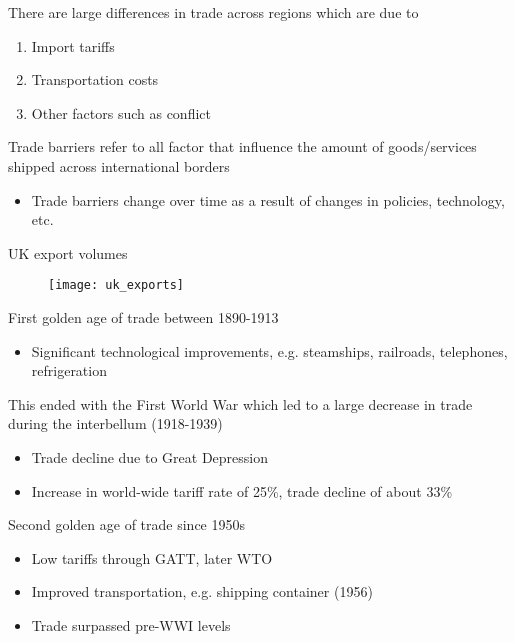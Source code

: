 \documentclass{beamer}
\begin{document}
\begin{frame}
  There are large differences in trade across regions which are due to
    \begin{enumerate}
      \item Import tariffs
      \item Transportation costs
      \item Other factors such as conflict
    \end{enumerate}
    \medskip
  Trade barriers refer to all factor that influence the amount of goods/services shipped across international borders
  \begin{itemize}
    \item Trade barriers change over time as a result of changes in policies, technology, etc. 
  \end{itemize}
\end{frame}

\begin{frame}{UK export volumes}
  \begin{figure}
    \texttt{[image: uk\_exports]}
  \end{figure}
  
\end{frame}



\begin{frame}{}
First golden age of trade between 1890-1913
\begin{itemize}
  \item Significant technological improvements, e.g. steamships, railroads, telephones, refrigeration
\end{itemize}
\medskip
This ended with the First World War which led to a large decrease in trade during the interbellum (1918-1939)
\begin{itemize}
  \item Trade decline due to Great Depression
  \item Increase in world-wide tariff rate of 25\%, trade decline of about 33\%
\end{itemize}
\medskip
Second golden age of trade since 1950s
\begin{itemize}
  \item Low tariffs through GATT, later WTO
  \item Improved transportation, e.g. shipping container (1956)
  \item Trade surpassed pre-WWI levels
\end{itemize}  
\end{frame}
\end{document}
